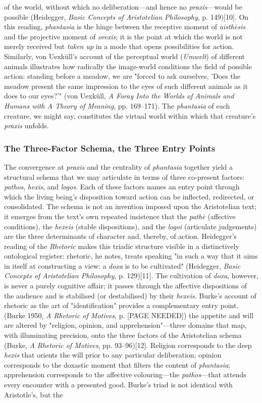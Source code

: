 \documentclass{article}
\begin{document}
of the world, without which no deliberation---and hence no \textit{praxis}---would be possible (Heidegger, \textit{Basic Concepts of Aristotelian Philosophy}, p. 149)[10]. On this reading, \textit{phantasia} is the hinge between the receptive moment of \textit{aisthēsis} and the projective moment of \textit{orexis}; it is the point at which the world is not merely received but \textit{taken up} in a mode that opens possibilities for action. Similarly, von Uexküll's account of the perceptual world (\textit{Umwelt}) of different animals illustrates how radically the image-world conditions the field of possible action: standing before a meadow, we are "forced to ask ourselves, 'Does the meadow present the same impression to the eyes of such different animals as it does to our eyes?'" (von Uexküll, \textit{A Foray Into the Worlds of Animals and Humans with A Theory of Meaning}, pp. 169--171). The \textit{phantasia} of each creature, we might say, constitutes the virtual world within which that creature's \textit{praxis} unfolds. \subsubsection*{The Three-Factor Schema, the Three Entry Points} The convergence at \textit{praxis} and the centrality of \textit{phantasia} together yield a structural schema that we may articulate in terms of three co-present factors: \textit{pathos}, \textit{hexis}, and \textit{logos}. Each of these factors names an entry point through which the living being's disposition toward action can be inflected, redirected, or consolidated. The schema is not an invention imposed upon the Aristotelian text; it emerges from the text's own repeated insistence that the \textit{pathē} (affective conditions), the \textit{hexeis} (stable dispositions), and the \textit{logoi} (articulate judgements) are the three determinants of character and, thereby, of action. Heidegger's reading of the \textit{Rhetoric} makes this triadic structure visible in a distinctively ontological register: rhetoric, he notes, treats speaking "in such a way that it aims in itself at constructing a view: a \textit{doxa} is to be cultivated" (Heidegger, \textit{Basic Concepts of Aristotelian Philosophy}, p. 129)[11]. The cultivation of \textit{doxa}, however, is never a purely cognitive affair; it passes through the affective dispositions of the audience and is stabilised (or destabilised) by their \textit{hexeis}. Burke's account of rhetoric as the art of "identification" provides a complementary entry point. (Burke 1950, \textit{A Rhetoric of Motives}, p. [PAGE NEEDED]) the appetite and will are altered by "religion, opinion, and apprehension"---three domains that map, with illuminating precision, onto the three factors of the Aristotelian schema (Burke, \textit{A Rhetoric of Motives}, pp. 93--96)[12]. Religion corresponds to the deep \textit{hexis} that orients the will prior to any particular deliberation; opinion corresponds to the doxastic moment that filters the content of \textit{phantasia}; apprehension corresponds to the affective colouring---the \textit{pathos}---that attends every encounter with a presented good. Burke's triad is not identical with Aristotle's, but the 
\end{document}
